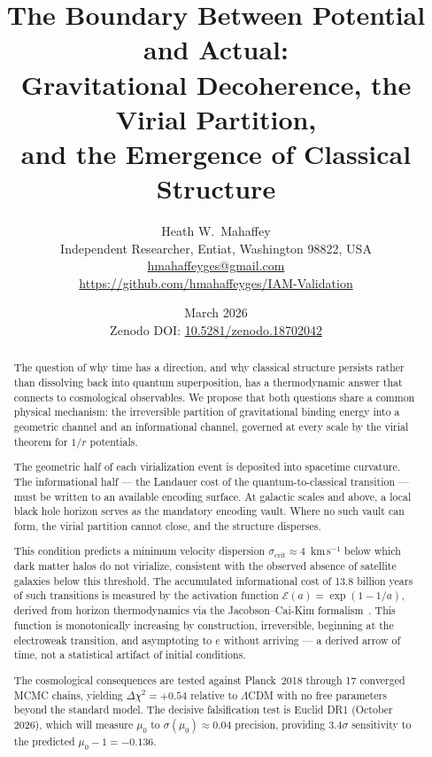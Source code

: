\documentclass[12pt,a4paper]{article}
\title{\textbf{The Boundary Between Potential and Actual:\\
Gravitational Decoherence, the Virial Partition,\\
and the Emergence of Classical Structure}}
\author{Heath W.\ Mahaffey\\
\small Independent Researcher, Entiat, Washington 98822, USA\\
\small \href{mailto:hmahaffeyges@gmail.com}{hmahaffeyges@gmail.com}\\
\small \url{https://github.com/hmahaffeyges/IAM-Validation}}
\date{March 2026\\
\small Zenodo DOI: \href{https://doi.org/10.5281/zenodo.18702042}{10.5281/zenodo.18702042}}
\begin{document}
\maketitle

\begin{abstract}
The question of why time has a direction, and why classical structure
persists rather than dissolving back into quantum superposition, has a
thermodynamic answer that connects to cosmological observables. We propose
that both questions share a common physical mechanism: the irreversible
partition of gravitational binding energy into a geometric channel and an
informational channel, governed at every scale by the virial theorem for
$1/r$ potentials.

The geometric half of each virialization event is deposited into spacetime
curvature. The informational half --- the Landauer cost of the
quantum-to-classical transition --- must be written to an available encoding
surface. At galactic scales and above, a local black hole horizon serves as
the mandatory encoding vault. Where no such vault can form, the virial
partition cannot close, and the structure disperses.

This condition predicts a minimum velocity dispersion $\sigma_\mathrm{crit}
\approx 4$~km\,s$^{-1}$ below which dark matter halos do not virialize,
consistent with the observed absence of satellite galaxies below this
threshold. The accumulated informational cost of 13.8 billion years of
such transitions is measured by the activation function $\mathcal{E}(a) =
\exp(1 - 1/a)$, derived from horizon thermodynamics via the
Jacobson--Cai-Kim formalism~\citep{Jacobson1995,CaiKim2005}. This function
is monotonically increasing by construction, irreversible, beginning at
the electroweak transition, and asymptoting to $e$ without arriving ---
a derived arrow of time, not a statistical artifact of initial conditions.

The cosmological consequences are tested against Planck~2018 through 17
converged MCMC chains, yielding $\Delta\chi^2 = +0.54$ relative to
$\Lambda$CDM with no free parameters beyond the standard model. The
decisive falsification test is Euclid DR1 (October 2026), which will
measure $\mu_0$ to $\sigma(\mu_0) \approx 0.04$ precision, providing
$3.4\sigma$ sensitivity to the predicted $\mu_0 - 1 = -0.136$.
\end{abstract}

\end{document}
